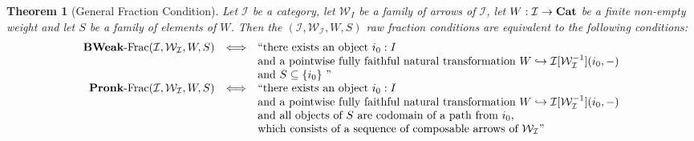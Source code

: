 \documentclass{article}
\numberwithin{equation}{section}
\theoremstyle{definition}
\theoremstyle{plain}
\newtheorem{theorem}[equation]{Theorem}
\newcommand{\Cat}{\textnormal{\textbf{Cat}}}
\begin{document}
\begin{theorem}[General Fraction Condition] 
	Let $\mathcal{I}$ be a category, let $\mathcal{W}_I$ be a family of arrows of $\mathcal{I}$, let $W: \mathcal{I} \to \Cat$ be a finite non-empty weight and let $S$ be a family of elements of $W$. Then the $(\mathcal{I}, \mathcal{W}_{\mathcal{I}}, W, S)$ raw fraction conditions are equivalent to the following conditions:
	\[\begin{array}{rcl}
		\textnormal{\textbf{BWeak}-Frac}(\mathcal{I}, \mathcal{W}_{\mathcal{I}}, W, S) & \Longleftrightarrow & \text{``there exists an object $i_0: I$}  \\
		&& \text{and a pointwise fully faithful natural transformation $W \hookrightarrow \mathcal{I}[\mathcal{W}_{\mathcal{I}}^{-1}](i_0,-)$}\\
		&& \text{and $S \subseteq \{i_0\}$ ''}\\
		
		\textnormal{\textbf{Pronk}-Frac}(\mathcal{I}, \mathcal{W}_{\mathcal{I}}, W, S) & \Longleftrightarrow & \text{``there exists an object $i_0: I$}  \\
		&& \text{and a pointwise fully faithful natural transformation $W \hookrightarrow \mathcal{I}[\mathcal{W}_{\mathcal{I}}^{-1}](i_0,-)$}\\
		&& \text{and all objects of $S$ are codomain of a path from $i_0$,}\\
		&& \text{which consists of a sequence of composable arrows of $\mathcal{W}_{\mathcal{I}}$''}
	\end{array}\]
\end{theorem}
\end{document}
